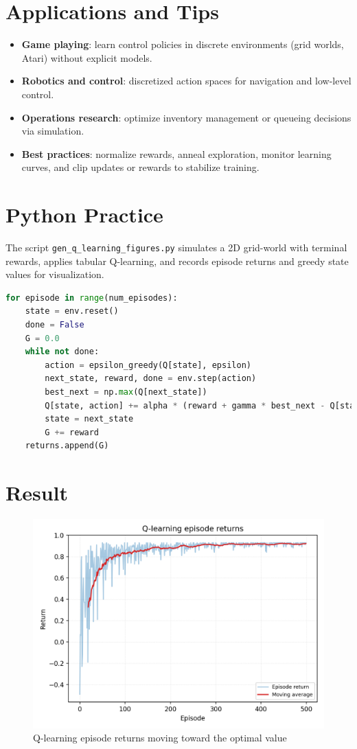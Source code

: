 ﻿\documentclass[12pt]{article}
\begin{document}
\section{Applications and Tips}
\begin{itemize}
  \item \textbf{Game playing}: learn control policies in discrete environments (grid worlds, Atari) without explicit models.
  \item \textbf{Robotics and control}: discretized action spaces for navigation and low-level control.
  \item \textbf{Operations research}: optimize inventory management or queueing decisions via simulation.
  \item \textbf{Best practices}: normalize rewards, anneal exploration, monitor learning curves, and clip updates or rewards to stabilize training.
\end{itemize}

\section{Python Practice}
The script \texttt{gen\_q\_learning\_figures.py} simulates a 2D grid-world with terminal rewards, applies tabular Q-learning, and records episode returns and greedy state values for visualization.
\begin{lstlisting}[language=Python,caption={Excerpt from gen_q_learning_figures.py}]
for episode in range(num_episodes):
    state = env.reset()
    done = False
    G = 0.0
    while not done:
        action = epsilon_greedy(Q[state], epsilon)
        next_state, reward, done = env.step(action)
        best_next = np.max(Q[next_state])
        Q[state, action] += alpha * (reward + gamma * best_next - Q[state, action])
        state = next_state
        G += reward
    returns.append(G)
\end{lstlisting}

\section{Result}
\begin{figure}[H]
  \centering
  \includegraphics[width=0.8\linewidth]{q_learning_returns.png}
  \caption{Q-learning episode returns moving toward the optimal value}
  \label{fig:q_learning_returns}
\end{figure}
\end{document}
